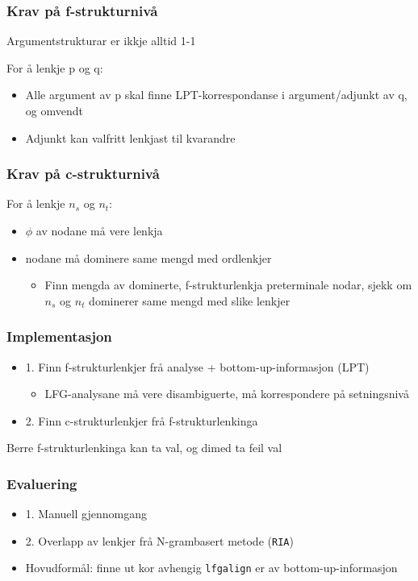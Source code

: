 \documentclass[bigger]{beamer}
\begin{document}
\begin{frame}\frametitle{Krav på f-strukturnivå}
  Argumentstrukturar er ikkje alltid 1-1
  
  For å lenkje p og q:
  \begin{itemize}
  \item Alle argument av p skal finne LPT-korrespondanse i argument/adjunkt av q, og omvendt
  \item Adjunkt kan valfritt lenkjast til kvarandre
  \end{itemize}
\end{frame}

\begin{frame}\frametitle{Krav på c-strukturnivå}
  For å lenkje $n_s$ og $n_t$:
  \begin{itemize}
  \item $\phi$ av nodane må vere lenkja
  \item nodane må dominere same mengd med ordlenkjer
    \begin{itemize}
    \item Finn mengda av dominerte, f-strukturlenkja preterminale
      nodar, sjekk om $n_s$ og $n_t$ dominerer same mengd med slike
      lenkjer
    \end{itemize}
  \end{itemize}
\end{frame}


\begin{frame}\frametitle{Implementasjon}
  \begin{itemize}
  \item 1. Finn f-strukturlenkjer frå analyse + bottom-up-informasjon (LPT)
    \begin{itemize}
    \item LFG-analysane må vere disambiguerte, må korrespondere på setningsnivå 
    \end{itemize}
  \item 2. Finn c-strukturlenkjer frå f-strukturlenkinga
  \end{itemize}

  Berre f-strukturlenkinga kan ta val, og dimed ta feil val
\end{frame}


\begin{frame}\frametitle{Evaluering}
  \begin{itemize}
  \item 1. Manuell gjennomgang
  \item 2. Overlapp av lenkjer frå N-grambasert metode (\texttt{RIA})
  \item Hovudformål: finne ut kor avhengig \texttt{lfgalign} er av
    bottom-up-informasjon
  \end{itemize}
\end{frame}
\end{document}
